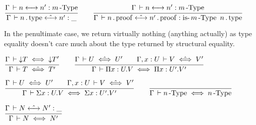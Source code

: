 \documentclass[a4paper,english]{lipics-utf8x}
\begin{document}
  \begin{center}
  \(
    \ru{\Gamma \der n \steq n' : \nType{m}
      }{\Gamma \der n \gettype \hsteq n' : \_}
    \qquad
    \ru{\Gamma \der n \steq n' : \nType{m}
      }{\Gamma \der n \getproof \hsteq n' \getproof : \isnType{m}{n \gettype}}
  \)
  \end{center}

  In the penultimate case, we return virtually nothing (anything actually) as
  type equality doesn't care much about the type returned by structural
  equality.


  \begin{center}
  \(
    \ru{\Gamma \der \red T \iff \red T'
      }{\Gamma \der T \hiff T'}
    \qquad
    \ru{\Gamma \der U \hiff U' \qquad
        \Gamma, x:U \der V \hiff V'
      }{\Gamma \der \Pi x:U.V \iff \Pi x:U'.V'}
  \)
  \end{center}

  \begin{center}
  \(
    \ru{\Gamma \der U \hiff U' \qquad
        \Gamma, x:U \der V \hiff V'
      }{\Gamma \der \Sigma x:U.V \iff \Sigma x:U'.V'}
    \qquad
    \ru{}{\Gamma \der \nType{n} \iff \nType{n}}
  \)
  \end{center}

  \begin{center}
  \(
    \ru{\Gamma \der N \hsteq N' : \_
      }{\Gamma \der N \iff N'}
  \)
  \end{center}
\end{document}
